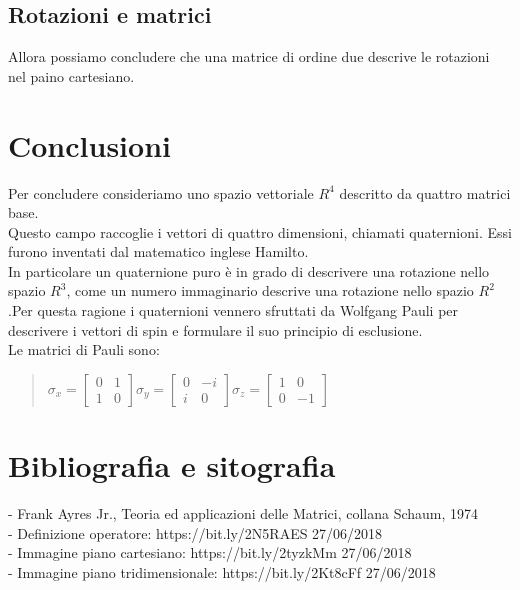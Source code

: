 \documentclass[a4paper]{article}
\begin{document}
\subsection{Rotazioni e matrici}
Allora possiamo concludere che una matrice di ordine due descrive le rotazioni nel paino cartesiano.
\section{Conclusioni}
Per concludere consideriamo uno spazio vettoriale $R^4$ descritto da quattro matrici base.
\\Questo campo raccoglie i vettori di quattro dimensioni, chiamati quaternioni. Essi furono inventati dal matematico inglese Hamilto.
\\In particolare un quaternione puro è in grado di descrivere una rotazione nello spazio $R^3$, come un numero immaginario descrive una rotazione nello spazio $R^2$.Per questa ragione i quaternioni vennero sfruttati da Wolfgang Pauli per descrivere i vettori di spin e formulare il suo principio di esclusione.
\\
Le matrici di Pauli sono:
\begin{quote} \centering$\sigma_{x}=\left[\begin{matrix}0&1\\ 1&0 \end{matrix}\right] \sigma_{y}=\left[\begin{matrix}0&-\textit{i}\\ \textit{i}&0 \end{matrix}\right] \sigma_{z}=\left[\begin{matrix}1&0\\ 0&-1 \end{matrix}\right]
$\end{quote}

\section{Bibliografia e sitografia}
- Frank Ayres Jr., Teoria ed applicazioni delle Matrici, collana Schaum, 1974\\
- Definizione operatore: https://bit.ly/2N5RAES 27/06/2018\\
- Immagine piano cartesiano: https://bit.ly/2tyzkMm 27/06/2018\\
- Immagine piano tridimensionale: https://bit.ly/2Kt8cFf 27/06/2018
\end{document}

